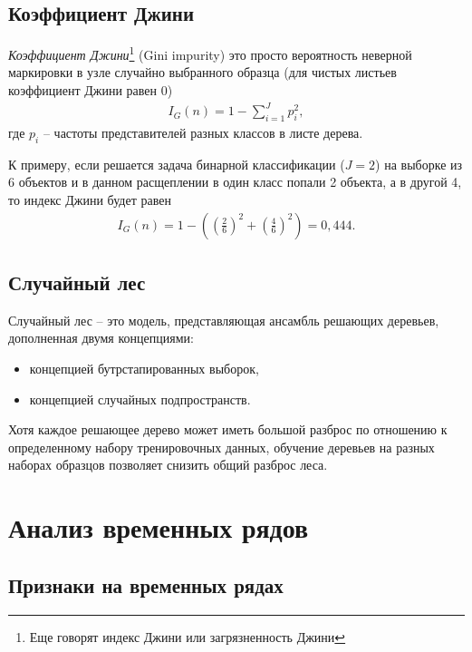 \documentclass[%
	11pt,
	a4paper,
	utf8,
		]{article}
\begin{document}
\subsection{Коэффициент Джини}

\emph{Коэффициент Джини}\footnote{Еще говорят индекс Джини или загрязненность Джини} (Gini impurity) это просто вероятность неверной маркировки в узле случайно выбранного образца (для чистых листьев коэффициент Джини равен 0)
\begin{align}
	I_G(n) = 1 - \sum_{i=1}^{J}p_i^2,
\end{align}
где $ p_i $ -- частоты представителей разных классов в листе дерева.

К примеру, если решается задача бинарной классификации ($ J = 2 $) на выборке из 6 объектов и в данном расщеплении в один класс попали 2 объекта, а в другой 4, то индекс Джини будет равен
\begin{align}
	I_G(n)=1 - \left( \left( \frac{2}{6} \right)^2 + \left( \frac{4}{6} \right)^2 \right) = 0,444.
\end{align}

\subsection{Случайный лес}

Случайный лес -- это модель, представляющая ансамбль решающих деревьев, дополненная двумя концепциями:
\begin{itemize}
	\item концепцией бутрстапированных выборок,
	
	\item концепцией случайных подпространств.
\end{itemize}

Хотя каждое решающее дерево может иметь большой разброс по отношению к определенному набору тренировочных данных, обучение деревьев на разных наборах образцов позволяет снизить общий разброс леса.


\section{Анализ временных рядов}

\subsection{Признаки на временных рядах}
\end{document}
